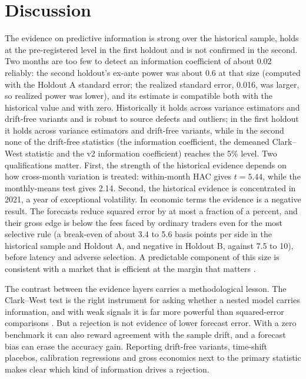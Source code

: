 \documentclass[11pt]{article}
\begin{document}
\section{Discussion}

The evidence on predictive information is strong over the historical sample, holds at the pre-registered level in the first holdout and is not confirmed in the second. Two months are too few to detect an information coefficient of about 0.02 reliably: the second holdout's ex-ante power was about 0.6 at that size (computed with the Holdout A standard error; the realized standard error, 0.016, was larger, so realized power was lower), and its estimate is compatible both with the historical value and with zero. Historically it holds across variance estimators and drift-free variants and is robust to source defects and outliers; in the first holdout it holds across variance estimators and drift-free variants, while in the second none of the drift-free statistics (the information coefficient, the demeaned Clark--West statistic and the v2 information coefficient) reaches the 5\% level. Two qualifications matter. First, the strength of the historical evidence depends on how cross-month variation is treated: within-month HAC gives $t=5.44$, while the monthly-means test gives 2.14. Second, the historical evidence is concentrated in 2021, a year of exceptional volatility. In economic terms the evidence is a negative result. The forecasts reduce squared error by at most a fraction of a percent, and their gross edge is below the fees faced by ordinary traders even for the most selective rule (a break-even of about 3.4 to 5.6 basis points per side in the historical sample and Holdout A, and negative in Holdout B, against 7.5 to 10), before latency and adverse selection. A predictable component of this size is consistent with a market that is efficient at the margin that matters \citep{chordia2008}.

The contrast between the evidence layers carries a methodological lesson. The Clark--West test is the right instrument for asking whether a nested model carries information, and with weak signals it is far more powerful than squared-error comparisons \citep{clarkwest2007,clarkmccracken2001}. But a rejection is not evidence of lower forecast error. With a zero benchmark it can also reward agreement with the sample drift, and a forecast bias can erase the accuracy gain. Reporting drift-free variants, time-shift placebos, calibration regressions and gross economics next to the primary statistic makes clear which kind of information drives a rejection.
\end{document}
